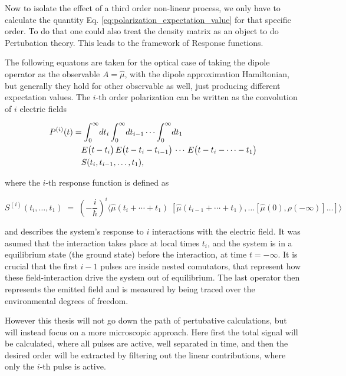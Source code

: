 \noindent
Now to isolate the effect of a third order non-linear process, we only have to calculate the quantity Eq. \eqref{eq:polarization_expectation_value} for that specific order.
To do that one could also treat the density matrix as an object to do Pertubation theory. This leads to the framework of Response functions. 

\noindent
The following equatons are taken for the optical case of taking the dipole operator as the observable $A = \hat{\mu}$, with the dipole approximation Hamiltonian, but generally they hold for other observable as well, just producing different expectation values. 
The $i$-th order polarization can be written as the convolution of $i$ electric fields \cite{hamm2005principlesnonlinearoptical}

\begin{align}
	P^{(i)}(t) &= \int_{0}^{\infty}\! dt_{i} \int_{0}^{\infty}\! dt_{i-1} \cdots \int_{0}^{\infty}\! dt_{1} \notag \\
	&\quad E\bigl(t-t_{i}\bigr)\, E\bigl(t-t_{i}-t_{i-1}\bigr)\,\cdots\, E\bigl(t-t_{i}-\cdots - t_{1}\bigr) \notag \\
	&\quad S(t_{i},t_{i-1},\ldots,t_{1}),
	\label{eq:response_convolution}
\end{align}

\noindent
where the $i$-th response function is defined as

\begin{equation}
	S^{(i)}(t_{i},\ldots,t_{1})
	\;=\;
	\left(-\frac{i}{\hbar}\right)^{i}
	\Big\langle
	\hat{\mu}(t_{i}+\cdots + t_{1})\;[\hat{\mu}(t_{i-1}+\cdots + t_{1}),\ldots [\hat{\mu}(0),\rho(-\infty)]\ldots]
	\Big\rangle
	\label{eq:response_function_S}
\end{equation}

\noindent
and describes the system's response to $i$ interactions with the electric field.
It was asumed that the interaction takes place at local times $t_i$, and the system is in a equilibrium state (the ground state) before the interaction, at time $t = - \infty$.
It is crucial that the first $i-1$ pulses are inside nested comutators, that represent how these field-interaction drive the system out of equilibrium. The last operator then represents the emitted field and is measured by being traced over the environmental degrees of freedom.

\noindent
However this thesis will not go down the path of pertubative calculations, but will instead focus on a more microscopic approach.
Here first the total signal will be calculated, where all pulses are active, well separated in time, and then the desired order will be extracted by filtering out the linear contributions, where only the $i$-th pulse is active.

